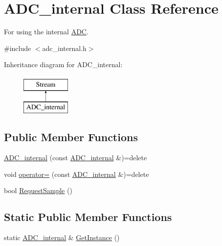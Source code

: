 \hypertarget{class_a_d_c__internal}{}\section{A\+D\+C\+\_\+internal Class Reference}
\label{class_a_d_c__internal}


For using the internal \hyperlink{class_a_d_c}{A\+DC}.  




{\ttfamily \#include $<$adc\+\_\+internal.\+h$>$}

Inheritance diagram for A\+D\+C\+\_\+internal\+:\begin{figure}[H]
\begin{center}
\leavevmode
\includegraphics[height=2.000000cm]{class_a_d_c__internal}
\end{center}
\end{figure}
\subsection*{Public Member Functions}
\begin{DoxyCompactItemize}
\item 
\hyperlink{class_a_d_c__internal_a7ae0c6415d603f8e4b86c735d4d235f5}{A\+D\+C\+\_\+internal} (const \hyperlink{class_a_d_c__internal}{A\+D\+C\+\_\+internal} \&)=delete
\item 
void \hyperlink{class_a_d_c__internal_a07f6b3f9703f2a5f6815904e371bb124}{operator=} (const \hyperlink{class_a_d_c__internal}{A\+D\+C\+\_\+internal} \&)=delete
\item 
bool \hyperlink{class_a_d_c__internal_accd9d981273a75e739f16232196f0d5e}{Request\+Sample} ()
\end{DoxyCompactItemize}
\subsection*{Static Public Member Functions}
\begin{DoxyCompactItemize}
\item 
static \hyperlink{class_a_d_c__internal}{A\+D\+C\+\_\+internal} \& \hyperlink{class_a_d_c__internal_aebcca86ecf84a34cbbb0994b4defc692}{Get\+Instance} ()
\end{DoxyCompactItemize}
